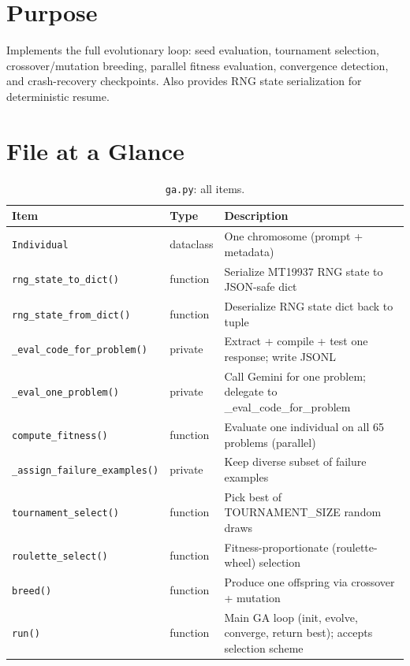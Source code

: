 \documentclass[11pt,a4paper]{report}
\newcommand{\pyfile}[1]{\texttt{#1}}
\newcommand{\fn}[1]{\texttt{#1}}
\begin{document}
\section{Purpose}

Implements the full evolutionary loop: seed evaluation, tournament selection,
crossover/mutation breeding, parallel fitness evaluation, convergence detection,
and crash-recovery checkpoints.  Also provides RNG state serialization for
deterministic resume.

\section{File at a Glance}

\begin{table}[h]
\centering
\begin{tabular}{@{}llp{8.5cm}@{}}
\toprule
\textbf{Item} & \textbf{Type} & \textbf{Description} \\
\midrule
\fn{Individual}              & dataclass & One chromosome (prompt + metadata) \\
\fn{rng\_state\_to\_dict()}  & function  & Serialize MT19937 RNG state to JSON-safe dict \\
\fn{rng\_state\_from\_dict()} & function & Deserialize RNG state dict back to tuple \\
\fn{\_eval\_code\_for\_problem()} & private & Extract + compile + test one response; write JSONL \\
\fn{\_eval\_one\_problem()}  & private   & Call Gemini for one problem; delegate to \_eval\_code\_for\_problem \\
\fn{compute\_fitness()}      & function  & Evaluate one individual on all 65 problems (parallel) \\
\fn{\_assign\_failure\_examples()} & private & Keep diverse subset of failure examples \\
\fn{tournament\_select()}    & function  & Pick best of TOURNAMENT\_SIZE random draws \\
\fn{roulette\_select()}      & function  & Fitness-proportionate (roulette-wheel) selection \\
\fn{breed()}                 & function  & Produce one offspring via crossover + mutation \\
\fn{run()}                   & function  & Main GA loop (init, evolve, converge, return best); accepts selection scheme \\
\bottomrule
\end{tabular}
\caption{\pyfile{ga.py}: all items.}
\end{table}
\end{document}
